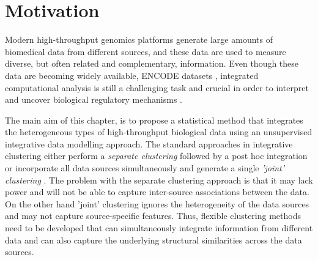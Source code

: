 \section{Motivation} \label{integr-motivation-intro-sect}
Modern high-throughput genomics platforms generate large amounts of biomedical data from different sources, and these data are used to measure diverse, but often related and complementary, information. Even though these data are becoming widely available, \eg ENCODE datasets \citep{Dunham2012}, integrated computational analysis is still a challenging task and crucial in order to interpret and uncover biological regulatory mechanisms \citep{Park2009}.   

The main aim of this chapter, is to propose a statistical method that integrates the heterogeneous types of high-throughput biological data using an unsupervised integrative data modelling approach. The standard approaches in integrative clustering either perform a \emph{separate clustering} followed by a post hoc integration \citep{Wang2011} or incorporate all data sources simultaneously and generate a single \emph{'joint' clustering} \citep{Kormaksson2012, Mo2013}. The problem with the separate clustering approach is that it may lack power and will not be able to capture inter-source associations between the data. On the other hand 'joint' clustering ignores the heterogeneity of the data sources and may not capture source-specific features. Thus, flexible clustering methods need to be developed that can simultaneously integrate information from different data and can also capture the underlying structural similarities across the data sources.